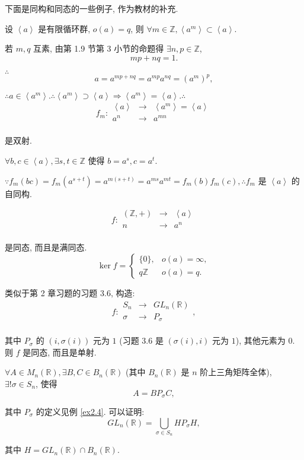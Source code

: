 \documentclass[color=black,device=normal,lang=cn,mode=geye]{elegantnote}
\begin{document}
下面是同构和同态的一些例子, 作为教材的补充.
\begin{example}
    设 $\left<a\right>$ 是有限循环群, $o(a)=q$, 则 $\forall m\in\mathbb{Z},\left<a^m\right>\subset\left<a\right>$.

    若 $m,q$ 互素, 由第 1.9 节第 3 小节的命题得 $\exists n,p\in\mathbb{Z}$,
    \[mp+nq=1.\]

    $\therefore$
    \[a=a^{mp+nq}=a^{mp}a^{nq}=(a^m)^p,\]

    $\therefore a\in\left<a^m\right>.\therefore\left<a^m\right>\supset\left<a\right>\Rightarrow\left<a^m\right>=\left<a\right>.\therefore$
    \[f_m:\begin{array}{rcl}
        \left<a\right> & \to & \left<a^m\right>=\left<a\right> \\
        a^n & \to & a^{mn} \\
    \end{array}\]

    是双射.

    $\forall b,c\in\left<a\right>,\exists s,t\in\mathbb{Z}$ 使得 $b=a^s,c=a^t$.

    $\because f_m(bc)=f_m(a^{s+t})=a^{m(s+t)}=a^{ms}a^{mt}=f_m(b)f_m(c),\therefore f_m$ 是 $\left<a\right>$ 的自同构.
\end{example}
\begin{example}
    \[f:\begin{array}{rcl}
        (\mathbb{Z},+) & \to & \left<a\right> \\
        n & \to & a^n \\
    \end{array}\]
    
    是同态, 而且是满同态.
    \[\ker f=\begin{cases}
        \{0\}, & o(a)=\infty, \\
        q\mathbb{Z} & o(a)=q.
    \end{cases}\]
\end{example}
\begin{example}\label{ex2.4}
    类似于第 2 章习题的习题 3.6, 构造:
    \[f:\begin{array}{rcl}
        S_n & \to & GL _n(\mathbb{R}) \\
        \sigma & \to & P_\sigma \\
    \end{array},\]

    其中 $P_\sigma$ 的 $(i,\sigma(i))$ 元为 $1$ (习题 3.6 是 $(\sigma(i),i)$ 元为 $1$), 其他元素为 $0$. 则 $f$ 是同态, 而且是单射.

    $\forall A\in M_n(\mathbb{R}),\exists B,C\in B_n(\mathbb{R})$ (其中 $B_n(\mathbb{R})$ 是 $n$ 阶上三角矩阵全体), $\exists!\sigma\in S_n$, 使得
    \[A=BP_\sigma C,\]

    其中 $P_\sigma$ 的定义见例 \ref{ex2.4}. 可以证明:
    \[ GL _n(\mathbb{R})=\bigcup\limits_{\sigma\in S_n}HP_\sigma H,\]

    其中 $H= GL _n(\mathbb{R})\cap B_n(\mathbb{R})$.
\end{example}
\end{document}
